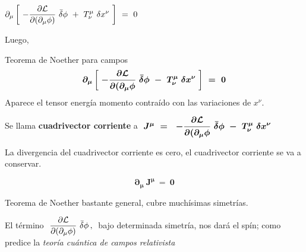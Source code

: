 $\displaystyle \partial_\mu \left[ \ -\pdv{\mathcal L}{(\partial_\mu \phi)} \ \bar \delta \phi \ + \ T^\mu_\nu \ \delta x^\nu \ \right] \ = \ 0$

Luego,

\vspace{0.5cm}

\begin{large}
\begin{myblock}{Teorema de Noether para campos}
\vspace{2mm}
\begin{equation}
\label{T35TNC}
\boldsymbol{
\partial_\mu \left[ \ -\pdv{\mathcal L}{(\partial_\mu \phi} \ \bar \delta \phi \ - \ T^\mu_\nu \ \delta x^\nu \ \right] \ = \ 0
}	
\end{equation}
	Aparece el tensor energía momento contraído con las variaciones de $x^\nu$.
	
	Se llama \textbf{cuadrivector corriente} a $\ \boldsymbol{ J^\mu \ = \ \displaystyle  \ -\pdv{\mathcal L}{(\partial_\mu \phi} \ \bar \delta \phi \ - \ T^\mu_\nu \ \delta x^\nu }$
	
	La divergencia del cuadrivector corriente es cero, el cuadrivector corriente se va a conservar.
	
\begin{equation}
\label{T35-4vJ}
\boldsymbol{
\partial_\mu \ J^\mu \ = \ 0
}	
\end{equation}

Teorema de Noether bastante general, cubre muchísimas simetrías.
\vspace{2mm}
\end{myblock}
\end{large}

\vspace{5mm}
\begin{ejemplo}
El término $\displaystyle \  \pdv{\mathcal L}{(\partial_\mu \phi)} \ \bar \delta \phi \, , \  $	bajo determinada simetría, nos dará el spín; como predice la  \emph{teoría cuántica de campos relativista}
\end{ejemplo}





